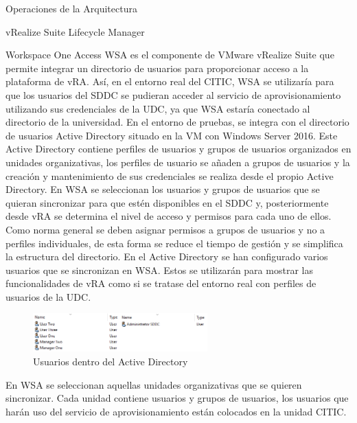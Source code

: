 \begin{subsection}{Operaciones de la Arquitectura}
\begin{subsubsection}{vRealize Suite Lifecycle Manager}
        
    \end{subsubsection}

    \begin{subsubsection}{Workspace One Access}
        \label{subsubsec:WSA}
        WSA es el componente de VMware vRealize Suite que permite integrar un directorio de usuarios para proporcionar acceso a la plataforma de vRA. Así, en el entorno real del CITIC, WSA se utilizaría para que los usuarios del SDDC se pudieran acceder al servicio de aprovisionamiento utilizando sus credenciales de la UDC, ya que WSA estaría conectado al directorio de la universidad.        
        En el entorno de pruebas, se integra con el directorio de usuarios Active Directory situado en la VM con Windows Server 2016. Este Active Directory contiene perfiles de usuarios y grupos de usuarios organizados en unidades organizativas, los perfiles de usuario se añaden a grupos de usuarios y la creación y mantenimiento de sus credenciales se realiza desde el propio Active Directory. En WSA se seleccionan los usuarios y grupos de usuarios que se quieran sincronizar para que estén disponibles en el SDDC y, posteriormente desde vRA se determina el nivel de acceso y permisos para cada uno de ellos. Como norma general se deben asignar permisos a grupos de usuarios y no a perfiles individuales, de esta forma se reduce el tiempo de gestión y se simplifica la estructura del directorio.
        En el Active Directory se han configurado varios usuarios que se sincronizan en WSA. Estos se utilizarán para mostrar las funcionalidades de vRA como si se tratase del entorno real con perfiles de usuarios de la UDC.
        \begin{figure}[h]
            \centering
            \includegraphics[width=0.6\textwidth]{imaxes/pruebaconcepto/vrealize/users-AD.png}
            \caption{Usuarios dentro del Active Directory}
            \label{fig:users-defined-AD}
        \end{figure}        
        En WSA se seleccionan aquellas unidades organizativas que se quieren sincronizar. Cada unidad contiene usuarios y grupos de usuarios, los usuarios que harán uso del servicio de aprovisionamiento están colocados en la unidad CITIC.

\end{subsubsection}
\end{subsection}
